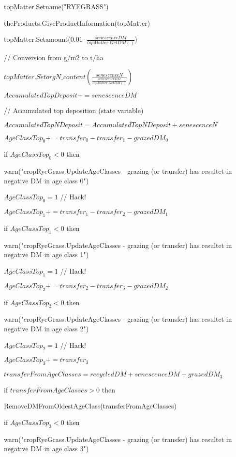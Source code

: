 \documentclass[%
]{scrartcl}
\begin{document}
 \quad      topMatter.Setname("RYEGRASS")

\quad       theProducts.GiveProductInformation(topMatter)

 \quad    	topMatter.Setamount($0.01 \cdot \tfrac{senescenceDM}{topMatter.GetDM()}$) 

//  Conversion from g/m2 to t/ha

 \quad     $ topMatter.SetorgN\_content(\tfrac{senescenceN}{\tfrac{senescenceDM}{topMatter.GetDM()}})$

 \quad     $ AccumulatedTopDeposit += senescenceDM $    

\quad //  Accumulated top deposition (state variable)

 \quad   	$AccumulatedTopNDeposit = AccumulatedTopNDeposit + senescenceN$


  $ AgeClassTop_0+=transfer_0-transfer_1 - grazedDM_0$
  
 if $AgeClassTop_0<0$ then

\quad      warn("cropRyeGrass.UpdateAgeClasses - grazing (or transfer) has resultet in negative DM in age class 0")
 
\quad        $AgeClassTop_0=1$ //  Hack!
 

  $ AgeClassTop_1+=transfer_1-transfer_2 - grazedDM_1$

   if $AgeClassTop_1<0$ then

 \quad        warn("cropRyeGrass.UpdateAgeClasses - grazing (or transfer) has resultet in negative DM in age class 1")

 \quad       $ AgeClassTop_1=1$ //  Hack!

  $ AgeClassTop_2+=transfer_2-transfer_3 - grazedDM_2$

   if $AgeClassTop_2<0$ then

  \quad       warn("cropRyeGrass.UpdateAgeClasses - grazing (or transfer) has resultet in negative DM in age class 2")

\quad         $AgeClassTop_2=1$ //  Hack!

   $AgeClassTop_3+=transfer_3$

$   transferFromAgeClasses = recycledDM + senescenceDM + grazedDM_3$

   if $transferFromAgeClasses>0$ then

 \quad     	RemoveDMFromOldestAgeClass(transferFromAgeClasses)

   if $AgeClassTop_3<0$ then

 \quad        warn("cropRyeGrass.UpdateAgeClasses - grazing (or transfer) has resultet in negative DM in age class 3")
\end{document}
